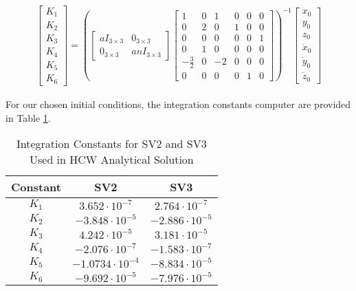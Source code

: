 \begin{align}
    \begin{bmatrix}
K_1 \\ K_2 \\ K_3 \\ K_4 \\ K_5 \\ K_6
\end{bmatrix} = \left(\begin{bmatrix}
a I_{3 \times 3} & 0_{3 \times 3} \\
0_{3 \times 3} & a n I_{3 \times 3}
\end{bmatrix}
\begin{bmatrix}
1 & 0 & 1 & 0 & 0 & 0 \\
0 & 2 & 0 & 1 & 0 & 0 \\
0 & 0 & 0 & 0 & 0 & 1 \\
0 & 1 & 0 & 0 & 0 & 0 \\
-\frac{3}{2} & 0 & -2 & 0 & 0 & 0 \\
0 & 0 & 0 & 0 & 1 & 0
\end{bmatrix}\right)^{-1} \begin{bmatrix}
x_0 \\ y_0 \\ z_0 \\ \dot{x}_0 \\ \dot{y}_0 \\ \dot{z}_0
\end{bmatrix}
\end{align}

For our chosen initial conditions, the integration constants computer are provided in Table \ref{tab:integration_constants_HCW}.

\begin{table}[ht]
    \centering
    \renewcommand{\arraystretch}{1.2}
    \begin{tabular}{c c c}
        \toprule
        \textbf{Constant} & \textbf{SV2} & \textbf{SV3} \\
        \midrule
        $K_1$ & $3.652\cdot10^{-7}$ & $2.764\cdot10^{-7}$ \\
        $K_2$ & $-3.848\cdot10^{-5}$ & $-2.886\cdot10^{-5}$ \\
        $K_3$ & $4.242\cdot10^{-5}$& $3.181\cdot10^{-5}$\\
        $K_4$ & $-2.076\cdot10^{-7}$ & $-1.583\cdot10^{-7}$ \\
        $K_5$ & $-1.0734\cdot10^{-4}$ & $-8.834\cdot10^{-5}$ \\
        $K_6$ & $-9.692\cdot10^{-5}$ & $-7.976\cdot10^{-5}$ \\
        \bottomrule
    \end{tabular}
    \caption{Integration Constants for SV2 and SV3 Used in HCW Analytical Solution}
    \label{tab:integration_constants_HCW}
\end{table}


